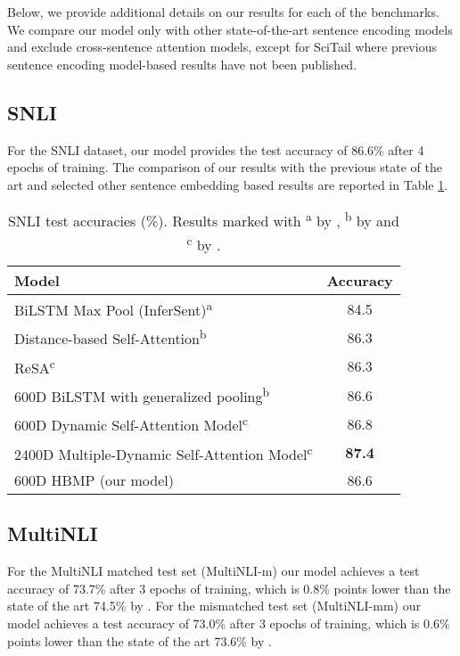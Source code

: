 \documentclass{nle}
\begin{document}
Below, we provide additional details on our results for each of the benchmarks. We compare our model only with other state-of-the-art sentence encoding models and exclude cross-sentence attention models, except for SciTail where previous sentence encoding model-based results have not been published.

\subsection{SNLI}

For the SNLI dataset, our model provides the test accuracy of 86.6\% after 4 epochs of training. The comparison of our results with the previous state of the art and selected other sentence embedding based results are reported in Table \ref{table:SNLIresults}.

\begin{table}[h]
\begin{small}
\begin{center}
\begin{tabular}{l c}
\hline \bf Model & \bf Accuracy \\ \hline
BiLSTM Max Pool (InferSent)\textsuperscript{a} & 84.5\\
Distance-based Self-Attention\textsuperscript{b} & 86.3 \\
ReSA\textsuperscript{c} & 86.3 \\
600D BiLSTM with generalized pooling\textsuperscript{b} & 86.6 \\
600D Dynamic Self-Attention Model\textsuperscript{c} & 86.8 \\
2400D Multiple-Dynamic Self-Attention Model\textsuperscript{c} & \bf 87.4 \\
\hline
600D HBMP (our model) & 86.6\\
\hline
\end{tabular}
\end{center}
\end{small}
\caption{\label{table:SNLIresults} SNLI test accuracies (\%). Results marked with \textsuperscript{a} by \cite{infersent}, \textsuperscript{b} by \cite{Chen18} and \textsuperscript{c} by \cite{yoon2018dynattn}.}
\end{table}

\subsection{MultiNLI}

For the MultiNLI matched test set (MultiNLI-m) our model achieves a test accuracy of 73.7\% after 3 epochs of training, which is 0.8\% points lower than the state of the art 74.5\% by \citet{Nie:repeval}. For the mismatched test set (MultiNLI-mm) our model achieves a test accuracy of 73.0\% after 3 epochs of training, which is 0.6\% points lower than the state of the art 73.6\% by \citet{chen:repeval}.
\end{document}
